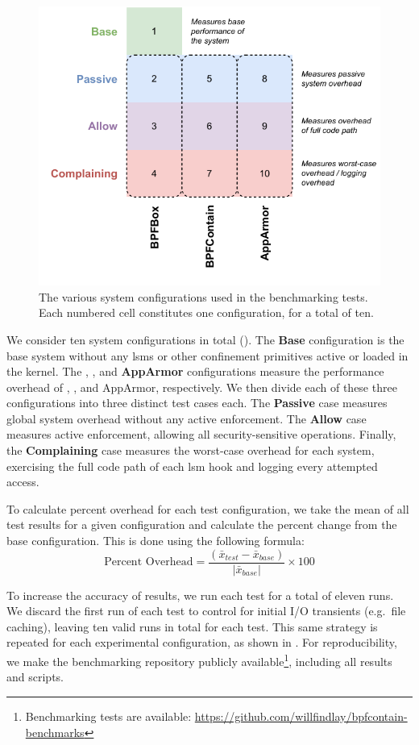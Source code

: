 \begin{figure}[htp]
  \centering
  \includegraphics[width=0.8\linewidth]{figs/eval/configuration.pdf}
  \caption[Benchmarking system configurations]{
    The various system configurations used in the benchmarking tests.
    Each numbered cell constitutes one configuration, for a total of ten.
  }%
  \label{fig:configuration}
\end{figure}

We consider ten system configurations in total (). The
\textbf{Base} configuration is the base system without any \glspl{lsm} or other
confinement primitives active or loaded in the kernel. The \textbf{\bpfbox},
\textbf{\bpfcontain}, and \textbf{AppArmor} configurations measure the performance
overhead of \bpfbox{}, \bpfcontain{}, and AppArmor, respectively. We then divide each of
these three configurations into three distinct test cases each. The \textbf{Passive} case
measures global system overhead without any active enforcement. The \textbf{Allow} case
measures active enforcement, allowing all security-sensitive operations. Finally, the
\textbf{Complaining} case measures the worst-case overhead for each system, exercising the
full code path of each \gls{lsm} hook and logging every attempted access.

To calculate percent overhead for each test configuration, we take the mean of all
test results for a given configuration and calculate the percent change from
the base configuration. This is done using the following formula:
$$
  \text{Percent Overhead} = \frac{\left(\bar{x}_{test} - \bar{x}_{base}\right)}{|\bar{x}_{base}|} \times 100
$$

To increase the accuracy of results, we run each test for a total of eleven runs. We
discard the first run of each test to control for initial I/O transients (e.g.~file
caching), leaving ten valid runs in total for each test. This same strategy is repeated
for each experimental configuration, as shown in . For
reproducibility, we make the benchmarking repository publicly
available\footnote{Benchmarking tests are available:
\url{https://github.com/willfindlay/bpfcontain-benchmarks}}, including all results and
scripts.

